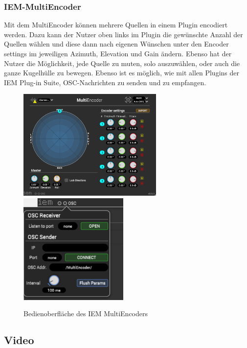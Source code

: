 \documentclass[11pt, titlepage, fleqn]{report}
\begin{document}
                \subsubsection{IEM-MultiEncoder}
                \label{sec:secMultiEncoder}
                    Mit dem MultiEncoder können mehrere Quellen in einem Plugin encodiert werden. Dazu kann der Nutzer oben links im Plugin die gewünschte 
                    Anzahl der Quellen wählen und diese dann nach eigenen Wünschen unter den Encoder settings im jeweiligen Azimuth, Elevation und Gain ändern. 
                    Ebenso hat der Nutzer die Möglichkeit, jede Quelle zu muten, solo auszuwählen, oder auch die ganze Kugelhülle zu bewegen.
                    Ebenso ist es möglich, wie mit allen Plugins der IEM 
                    Plug-in Suite, OSC-Nachrichten zu senden und zu empfangen.
                    \vspace{.25cm}
                    \begin{figure}[htbp]
                        \centering
                        \includegraphics[height=5.5cm]{./img/MultiEncoder.png}
                        \includegraphics[height=5.5cm]{./img/MultiEncoderOSC.png}
                        \caption{Bedienoberfläche des IEM MultiEncoders \label{fig:MultiEncoder}}
                    \end{figure}
                    \subsection{Video}
            \label{sec:2.3.2Video}
\end{document}
